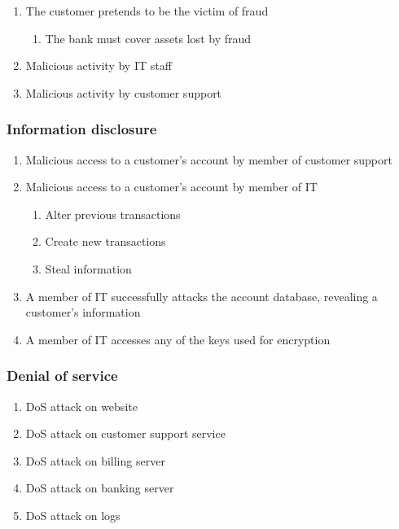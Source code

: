 \begin{enumerate}[resume]
    \item The customer pretends to be the victim of fraud
    \begin{enumerate}
        \item The bank must cover assets lost by fraud
    \end{enumerate}

    \item Malicious activity by IT staff
    \item Malicious activity by customer support
\end{enumerate}

\subsubsection{Information disclosure}

\begin{enumerate}[resume]
    \item Malicious access to a customer's account by member of customer support

    \item Malicious access to a customer's account by member of IT
    \begin{enumerate}
        \item Alter previous transactions
        \item Create new transactions
        \item Steal information
    \end{enumerate}

    \item A member of IT successfully attacks the account database, revealing a customer's information

    \item A member of IT accesses any of the keys used for encryption
\end{enumerate}

\subsubsection{Denial of service}

\begin{enumerate}[resume]
    \item DoS attack on website
    \item DoS attack on customer support service
    \item DoS attack on billing server
    \item DoS attack on banking server
    \item DoS attack on logs
\end{enumerate}

